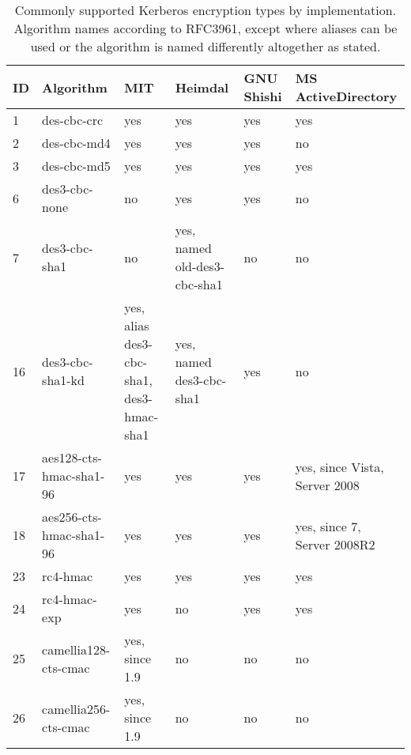 \begin{table}[h]
	\centering
	\small
	\begin{tabular}{ll|llll}
		\toprule
		ID & Algorithm & MIT & Heimdal & GNU Shishi & MS ActiveDirectory \\
		\midrule
		1  & des-cbc-crc             & yes            & yes & yes & yes \\
		2  & des-cbc-md4             & yes            & yes & yes & no  \\
		3  & des-cbc-md5             & yes            & yes & yes & yes \\
		6  & des3-cbc-none           & no             & yes & yes & no  \\
		7  & des3-cbc-sha1           & no             & yes, {\tiny named old-des3-cbc-sha1} & no  & no  \\
		16 & des3-cbc-sha1-kd & yes, {\tiny alias des3-cbc-sha1, des3-hmac-sha1} & yes, {\tiny named des3-cbc-sha1} & yes & no  \\
		17 & aes128-cts-hmac-sha1-96 & yes            & yes & yes & yes, {\tiny since Vista, Server 2008} \\
		18 & aes256-cts-hmac-sha1-96 & yes            & yes & yes & yes, {\tiny since 7, Server 2008R2} \\
		23 & rc4-hmac                & yes            & yes & yes & yes \\
		24 & rc4-hmac-exp            & yes            & no  & yes & yes \\
		25 & camellia128-cts-cmac    & yes, since 1.9 & no  & no  & no  \\
		26 & camellia256-cts-cmac    & yes, since 1.9 & no  & no  & no  \\
		\bottomrule
	\end{tabular}
	\caption{Commonly supported Kerberos encryption types by implementation. Algorithm names according to RFC3961, except where aliases can be used or the algorithm is named differently altogether as stated.}
	\label{tab:Kerberos_enctypes}
\end{table}


